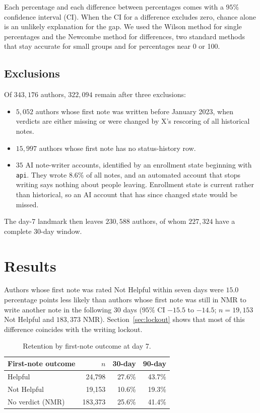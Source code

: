 \documentclass[sigconf,nonacm]{acmart}
\begin{document}
Each percentage and each difference between percentages comes with a $95\%$ confidence
interval (CI). When the CI for a difference excludes zero, chance alone is an unlikely 
explanation for the gap. We used the Wilson method for single percentages and the Newcombe 
method for differences, two standard methods that stay accurate for small groups and for 
percentages near 0 or 100.

\subsection{Exclusions}
\label{sec:exclusions}

Of $343{,}176$ authors, $322{,}094$ remain after three exclusions:

\begin{itemize}
  \item $5{,}052$ authors whose first note was written before January 2023, when verdicts
        are either missing or were changed by X's rescoring of all historical notes.
  \item $15{,}997$ authors whose first note has no status-history row.
  \item $35$ AI note-writer accounts, identified by an enrollment state beginning with
        \texttt{api}. They wrote $8.6\%$ of all notes, and an automated account that stops
        writing says nothing about people leaving. Enrollment state is current rather than
        historical, so an AI account that has since changed state would be missed.
\end{itemize}

The day-7 landmark then leaves $230{,}588$ authors, of whom $227{,}324$ have a complete
30-day window.

\section{Results}

Authors whose first note was rated Not Helpful within seven days were $15.0$ percentage
points less likely than authors whose first note was still in NMR to write another note in
the following 30 days ($95\%$ CI $-15.5$ to $-14.5$; $n=19{,}153$ Not Helpful and
$183{,}373$ NMR). Section~\ref{sec:lockout} shows that most of this difference coincides
with the writing lockout.

\begin{table}[t]
  \caption{Retention by first-note outcome at day 7.}
  \label{tab:primary}
  \begin{tabular}{lrrr}
    \toprule
    First-note outcome & $n$ & 30-day & 90-day \\
    \midrule
    Helpful          & 24,798  & 27.6\% & 43.7\% \\
    Not Helpful      & 19,153  & 10.6\% & 19.3\% \\
    No verdict (NMR) & 183,373 & 25.6\% & 41.4\% \\
    \bottomrule
  \end{tabular}
\end{table}
\end{document}
